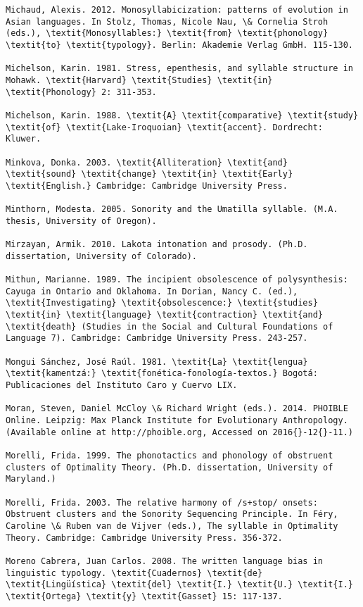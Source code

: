 \begin{verbatim}
Michaud, Alexis. 2012. Monosyllabicization: patterns of evolution in Asian languages. In Stolz, Thomas, Nicole Nau, \& Cornelia Stroh (eds.), \textit{Monosyllables:} \textit{from} \textit{phonology} \textit{to} \textit{typology}. Berlin: Akademie Verlag GmbH. 115-130.

Michelson, Karin. 1981. Stress, epenthesis, and syllable structure in Mohawk. \textit{Harvard} \textit{Studies} \textit{in} \textit{Phonology} 2: 311-353.

Michelson, Karin. 1988. \textit{A} \textit{comparative} \textit{study} \textit{of} \textit{Lake-Iroquoian} \textit{accent}. Dordrecht: Kluwer.

Minkova, Donka. 2003. \textit{Alliteration} \textit{and} \textit{sound} \textit{change} \textit{in} \textit{Early} \textit{English.} Cambridge: Cambridge University Press.

Minthorn, Modesta. 2005. Sonority and the Umatilla syllable. (M.A. thesis, University of Oregon).

Mirzayan, Armik. 2010. Lakota intonation and prosody. (Ph.D. dissertation, University of Colorado).

Mithun, Marianne. 1989. The incipient obsolescence of polysynthesis: Cayuga in Ontario and Oklahoma. In Dorian, Nancy C. (ed.), \textit{Investigating} \textit{obsolescence:} \textit{studies} \textit{in} \textit{language} \textit{contraction} \textit{and} \textit{death} (Studies in the Social and Cultural Foundations of Language 7). Cambridge: Cambridge University Press. 243-257.

Mongui Sánchez, José Raúl. 1981. \textit{La} \textit{lengua} \textit{kamentzá:} \textit{fonética-fonología-textos.} Bogotá: Publicaciones del Instituto Caro y Cuervo LIX.

Moran, Steven, Daniel McCloy \& Richard Wright (eds.). 2014. PHOIBLE Online. Leipzig: Max Planck Institute for Evolutionary Anthropology. (Available online at http://phoible.org, Accessed on 2016{}-12{}-11.)

Morelli, Frida. 1999. The phonotactics and phonology of obstruent clusters of Optimality Theory. (Ph.D. dissertation, University of Maryland.)

Morelli, Frida. 2003. The relative harmony of /s+stop/ onsets: Obstruent clusters and the Sonority Sequencing Principle. In Féry, Caroline \& Ruben van de Vijver (eds.), The syllable in Optimality Theory. Cambridge: Cambridge University Press. 356-372. 

Moreno Cabrera, Juan Carlos. 2008. The written language bias in linguistic typology. \textit{Cuadernos} \textit{de} \textit{Lingüística} \textit{del} \textit{I.} \textit{U.} \textit{I.} \textit{Ortega} \textit{y} \textit{Gasset} 15: 117-137.


\end{verbatim}
